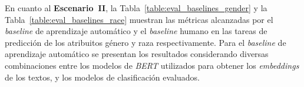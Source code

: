 \begin{table}[htpb]
    \centering
    \caption{Resumen de m\'etricas de concordancia entre \emph{ChatGPT} y el corpus final.}
    \label{table:agreement_gpt}
\end{table}

En cuanto al \textbf{Escenario~II}, la Tabla~\ref{table:eval_baselines_gender} y la Tabla~\ref{table:eval_baselines_race}
muestran las m\'etricas alcanzadas por el \emph{baseline} de aprendizaje autom\'atico y el \emph{baseline} humano en las tareas de 
predicci\'on de los atribuitos g\'enero y raza respectivamente. Para el \emph{baseline} de aprendizaje autom\'atico se presentan 
los resultados considerando diversas combinaciones entre los modelos de \emph{BERT} utilizados para obtener los 
\emph{embeddings} de los textos, y los modelos de clasificaci\'on evaluados. 

